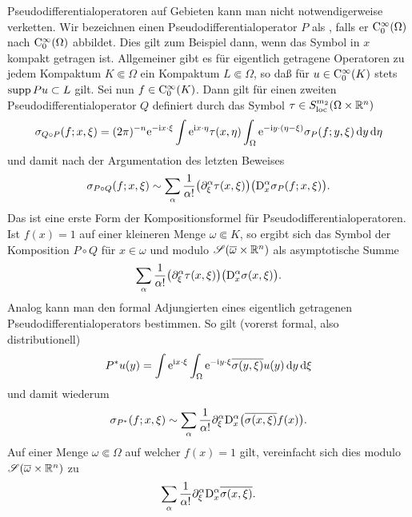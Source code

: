 Pseudodifferentialoperatoren auf Gebieten kann man nicht notwendigerweise verketten. Wir bezeichnen einen Pseudodifferentialoperator $P$ als , falls er $\mathrm C_0^\infty(\Omega)$ nach $\mathrm C_0^\infty(\Omega)$ abbildet. Dies gilt zum Beispiel dann, wenn das Symbol in $x$ kompakt getragen ist. Allgemeiner gibt es für eigentlich getragene Operatoren zu jedem Kompaktum $K\Subset\Omega$ ein Kompaktum $L\Subset\Omega$, so daß für $u\in\mathrm C_0^\infty(K)$ stets $\operatorname{supp} Pu \subset L$ gilt. Sei nun $f\in\mathrm C_0^\infty(K)$. Dann gilt für einen zweiten Pseudodifferentialoperator $Q$ definiert durch das Symbol $\tau\in S^{m_2}_{\rm loc}(\Omega\times\mathbb R^n)$
\begin{equation}
    \sigma_{Q\circ P} (f;x,\xi) = (2\pi)^{-n} \mathrm e^{-\mathrm i x\cdot\xi} \int \mathrm e^{\mathrm i x\cdot\eta}  \tau(x,\eta) 
      \int_{\Omega} \mathrm e^{-\mathrm i y\cdot(\eta-\xi)} \sigma_P(f;y,\xi) \,\mathrm d y \,\mathrm d\eta 
\end{equation}
und damit nach der Argumentation des letzten Beweises
\begin{equation}
    \sigma_{P\circ Q}(f;x,\xi) \sim \sum_\alpha \frac1{\alpha!} \big(\partial_\xi^\alpha \tau(x,\xi)\big) \big( \mathrm D_x^\alpha \sigma_P(f;x,\xi)\big).
\end{equation}
Das ist eine erste Form der Kompositionsformel für Pseudodifferentialoperatoren. Ist $f(x)=1$ auf einer kleineren Menge $\omega\Subset K$, so ergibt sich das Symbol der Komposition $P\circ Q$ für $x\in\omega$ und modulo $\mathscr S(\overline\omega\times\mathbb R^n)$ als asymptotische Summe
\begin{equation}
    \sum_{\alpha}  \frac1{\alpha!} \big(\partial_\xi^\alpha \tau(x,\xi)\big) \big( \mathrm D_x^\alpha \sigma(x,\xi)\big).
\end{equation}
Analog kann man den formal Adjungierten eines eigentlich getragenen Pseudodifferentialoperators bestimmen. So gilt (vorerst formal, also distributionell)
\begin{equation}
   P^* u (y) =\int \mathrm e^{\mathrm i x\cdot\xi}  \int_\Omega \mathrm e^{-\mathrm i y\cdot\xi} \overline{\sigma(y,\xi)} u(y)\,\mathrm d y\,\mathrm d\xi
\end{equation}
und damit wiederum
\begin{equation}
   \sigma_{P^*}(f;x,\xi) \sim \sum_\alpha \frac1{\alpha!} \partial_\xi^\alpha\mathrm D_x^\alpha \big(\overline{\sigma(x,\xi)} f(x)\big).
\end{equation}
Auf einer Menge $\omega\Subset\Omega$ auf welcher $f(x)=1$ gilt, vereinfacht sich dies modulo $\mathscr S(\overline\omega\times\mathbb R^n)$  zu
\begin{equation}
   \sum_\alpha \frac1{\alpha!} \partial_\xi^\alpha\mathrm D_x^\alpha \overline{\sigma(x,\xi)}.
\end{equation}
